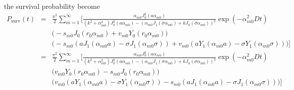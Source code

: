 \documentclass{article}
\begin{document}
%
the survival probability become
%
\begin{eqnarray}
        P_{\mathrm{surv}}(t)
    &=& \frac{\pi^2}{2} \sum_{m=1}^{\infty}
    \Bigg[
        \frac{\alpha_{m0} J^2_0(a\alpha_{m0})}
             {(k^2 + \alpha_{m0}^2) J_0^2(a\alpha_{m0}) -
              (\alpha_{m0}J_1(\sigma\alpha_{m0}) + kJ_0(\sigma\alpha_{m0}))^2}
        \exp(-\alpha_{m0}^2Dt)
        \nonumber\\
    & & \Big(-s_{m0}J_0(r_0\alpha_{m0}) + v_{m0}Y_0(r_0\alpha_{m0})\Big)
        \nonumber\\
    & & \Big(
        -s_{m0} \left(aJ_1(\alpha_{m0}a) - \sigma J_1(\alpha_{m0}\sigma)\right)
        +v_{m0} \left(aY_1(\alpha_{m0}a) - \sigma Y_1(\alpha_{m0}\sigma)\right)
        \Big)
    \Bigg] \nonumber\\
    &=& \frac{\pi^2}{2} \sum_{m=1}^{\infty}
    \Bigg[
        \frac{\alpha_{m0} J^2_0(a\alpha_{m0})}
             {(k^2 + \alpha_{m0}^2) J_0^2(a\alpha_{m0}) -
              (\alpha_{m0}J_1(\sigma\alpha_{m0}) + kJ_0(\sigma\alpha_{m0}))^2}
        \exp(-\alpha_{m0}^2Dt)
        \nonumber\\
    & & \Big(v_{m0}Y_0(r_0\alpha_{m0}) - s_{m0}J_0(r_0\alpha_{m0})\Big)
        \nonumber\\
    & & \Big(
        v_{m0} \left(aY_1(\alpha_{m0}a) - \sigma Y_1(\alpha_{m0}\sigma)\right) -
        s_{m0} \left(aJ_1(\alpha_{m0}a) - \sigma J_1(\alpha_{m0}\sigma)\right)
        \Big)
    \Bigg]
\end{eqnarray}
\end{document}

